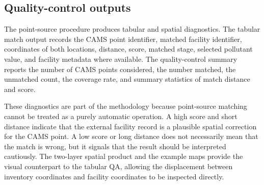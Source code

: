 \subsection{Quality-control outputs}

The point-source procedure produces tabular and spatial diagnostics. The
tabular match output records the CAMS point identifier, matched facility
identifier, coordinates of both locations, distance, score, matched
stage, selected pollutant value, and facility metadata where available.
The quality-control summary reports the number of CAMS points considered,
the number matched, the unmatched count, the coverage rate, and summary
statistics of match distance and score.

These diagnostics are part of the methodology because point-source
matching cannot be treated as a purely automatic operation. A high score
and short distance indicate that the external facility record is a
plausible spatial correction for the CAMS point. A low score or long
distance does not necessarily mean that the match is wrong, but it
signals that the result should be interpreted cautiously. The two-layer
spatial product and the example maps provide the visual counterpart to
the tabular QA, allowing the displacement between inventory coordinates
and facility coordinates to be inspected directly.
